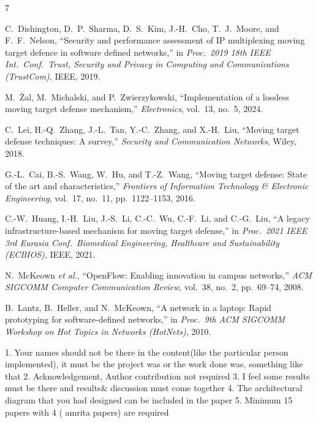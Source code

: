 \documentclass[conference]{IEEEtran}
\begin{document}
\begin{thebibliography}{7}

C.~Dishington, D.~P.~Sharma, D.~S.~Kim, J.-H.~Cho, T.~J.~Moore, and F.~F.~Nelson, ``Security and performance assessment of IP multiplexing moving target defence in software defined networks,'' in \emph{Proc.\ 2019 18th IEEE Int.\ Conf.\ Trust, Security and Privacy in Computing and Communications (TrustCom)}, IEEE, 2019.

M.~\.{Z}al, M.~Michalski, and P.~Zwierzykowski, ``Implementation of a lossless moving target defense mechanism,'' \emph{Electronics}, vol.~13, no.~5, 2024.

C.~Lei, H.-Q.~Zhang, J.-L.~Tan, Y.-C.~Zhang, and X.-H.~Liu, ``Moving target defense techniques: A survey,'' \emph{Security and Communication Networks}, Wiley, 2018.

G.-L.~Cai, B.-S.~Wang, W.~Hu, and T.-Z.~Wang, ``Moving target defense: State of the art and characteristics,'' \emph{Frontiers of Information Technology \& Electronic Engineering}, vol.~17, no.~11, pp.~1122--1153, 2016.

C.-W.~Huang, I.-H.~Liu, J.-S.~Li, C.-C.~Wu, C.-F.~Li, and C.-G.~Liu, ``A legacy infrastructure-based mechanism for moving target defense,'' in \emph{Proc.\ 2021 IEEE 3rd Eurasia Conf.\ Biomedical Engineering, Healthcare and Sustainability (ECBIOS)}, IEEE, 2021.

N.~McKeown \emph{et al.}, ``OpenFlow: Enabling innovation in campus networks,'' \emph{ACM SIGCOMM Computer Communication Review}, vol.~38, no.~2, pp.~69--74, 2008.

B.~Lantz, B.~Heller, and N.~McKeown, ``A network in a laptop: Rapid prototyping for software-defined networks,'' in \emph{Proc.\ 9th ACM SIGCOMM Workshop on Hot Topics in Networks (HotNets)}, 2010.

1. Your names should not be there in the content(like the particular person implemented), it must be the project was or the work done was, something like that
2. Acknowledgement, Author contribution not required
3. I feel some results must be there and results& discussion must come together
4. The architectural diagram that you had designed can be included in the paper
5. Minimum 15 papers with 4 ( amrita papers) are required

\end{thebibliography}

\balance
\end{document}
